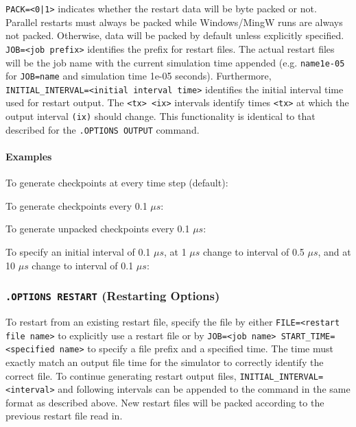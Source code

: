 \texttt{PACK=<0|1>} indicates whether the restart data will be byte packed
or not.  Parallel restarts must always be packed while Windows/MingW
runs are always not packed.  Otherwise, data will be packed by default unless
explicitly specified.
\texttt{JOB=<job prefix>} identifies the prefix for restart files.  The
actual restart files will be the job name with the current simulation time
appended (e.g. \texttt{name1e-05} for \texttt{JOB=name} and simulation time
1e-05 seconds).  Furthermore, \texttt{INITIAL\_INTERVAL=<initial interval
  time>} identifies the initial interval time used for restart output.  The
\texttt{<tx> <ix>} intervals identify times \texttt{<tx>} at which the output
interval \texttt{(ix)} should change.  This functionality is identical to
that described for the \texttt{.OPTIONS OUTPUT} command.

\paragraph{Examples}

To generate checkpoints at every time step (default):


To generate checkpoints every 0.1 $\mu s$:


To generate unpacked checkpoints every 0.1 $\mu s$:


To specify an initial interval of 0.1 $\mu s$, at 1 $\mu s$ change to interval
of 0.5 $\mu s$, and at 10 $\mu s$ change to interval of 0.1 $\mu s$:


\subsubsection{\texttt{.OPTIONS RESTART} (Restarting Options)}

To restart from an existing restart file, specify the file
by either \texttt{FILE=<restart file name>} to explicitly use a restart file or
by \texttt{JOB=<job name> START\_TIME=<specified name>} to specify a file
prefix and a specified time.  The time must exactly match an output file time
for the simulator to correctly identify the correct file.  To continue
generating restart output files, \texttt{INITIAL\_INTERVAL=<interval>} and
following intervals can be appended to the command in the same format as
described above.  New restart files will be packed according to the previous
restart file read in.  

